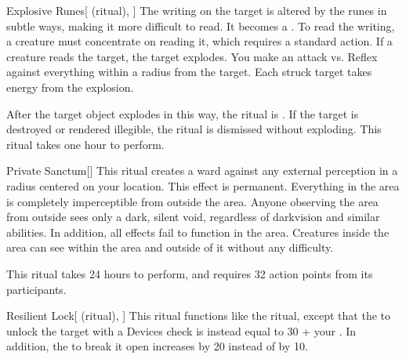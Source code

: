 \lowercase{\hypertarget{spell:Explosive Runes}{}}\label{spell:Explosive Runes}
\begin{attuneability}[Rank 4]{\hypertarget{spell:Explosive Runes}{Explosive Runes}}[ (ritual), ]
The writing on the target is altered by the runes in subtle ways, making it more difficult to read.
It becomes a .
To read the writing, a creature must concentrate on reading it, which requires a standard action.
If a creature reads the target, the target explodes.
You make an attack vs. Reflex against everything within a \areamed radius from the target.
Each struck target takes energy  from the explosion.

After the target object explodes in this way, the ritual is .
If the target is destroyed or rendered illegible, the ritual is dismissed without exploding.
This ritual takes one hour to perform.
\end{attuneability}
\vspace{0.25em}



\lowercase{\hypertarget{spell:Private Sanctum}{}}\label{spell:Private Sanctum}
\begin{apability}[Rank 5]{\hypertarget{spell:Private Sanctum}{Private Sanctum}}[]
\targetrule
This ritual creates a ward against any external perception in a \arealarge radius  centered on your location.
This effect is permanent.
Everything in the area is completely imperceptible from outside the area.
Anyone observing the area from outside sees only a dark, silent void, regardless of darkvision and similar abilities.
In addition, all  effects fail to function in the area.
Creatures inside the area can see within the area and outside of it without any difficulty.

This ritual takes 24 hours to perform, and requires 32 action points from its participants.
\end{apability}
\vspace{0.25em}



\lowercase{\hypertarget{spell:Resilient Lock}{}}\label{spell:Resilient Lock}
\begin{attuneability}[Rank 5]{\hypertarget{spell:Resilient Lock}{Resilient Lock}}[ (ritual), ]
This ritual functions like the  ritual, except that the  to unlock the target with a Devices check is instead equal to 30 + your .
In addition, the  to break it open increases by 20 instead of by 10.
\end{attuneability}
\vspace{0.25em}



